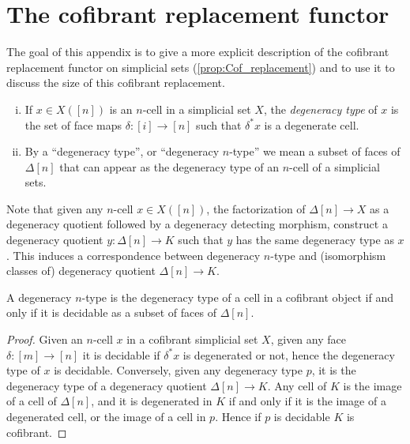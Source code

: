 \documentclass[reqno,10pt,a4paper,oneside,draft]{amsart}
\begin{document}
\appendix

\section{The cofibrant replacement functor}
\label{sec:appendix}


The goal of this appendix is to give a more explicit description of the cofibrant replacement functor on simplicial sets (\cref{prop:Cof_replacement}) and to use it to discuss the size of this cofibrant replacement.


\begin{definition}\hfill
\begin{enumerate}[(i)]  
\item If $x \in X([n])$ is an $n$-cell in a simplicial set $X$, the \emph{degeneracy type} of $x$ is the set of face maps $\delta:[i] \rightarrow [n]$ such that $\delta^* x$ is a degenerate cell.
\item By a ``degeneracy type'', or ``degeneracy $n$-type'' we mean a subset of faces of $\Delta[n]$ that can appear as the degeneracy type of an $n$-cell of a simplicial sets.
\end{enumerate}
\end{definition}

\medskip

Note that given any $n$-cell $x \in X([n])$, the factorization of $\Delta[n] \rightarrow X$ as a degeneracy quotient followed by a degeneracy detecting morphism, construct a degeneracy quotient $y:\Delta[n] \rightarrow K$ such that $y$ has the same degeneracy type as $x$. This induces a correspondence between degeneracy $n$-type and (isomorphism classes of) degeneracy quotient $\Delta[n] \rightarrow K$. 

\begin{lemma} A degeneracy $n$-type is the degeneracy type of a cell in a cofibrant object  if and only if it is decidable as a subset of faces of $\Delta[n]$.
\end{lemma}


\begin{proof}
Given an $n$-cell $x$ in a cofibrant simplicial set $X$, given any face $\delta:[m] \rightarrow [n]$ it is decidable if $\delta^* x$ is degenerated or not, hence the degeneracy type of $x$ is decidable. Conversely, given any degeneracy type $p$, it is the degeneracy type of a degeneracy quotient $\Delta[n] \rightarrow K$. Any cell of $K$ is the image of a cell of $\Delta[n]$, and it is degenerated in $K$ if and only if it is the image of a degenerated cell, or the image of a cell in $p$. Hence if $p$ is decidable $K$ is cofibrant.
\end{proof}
\end{document}
